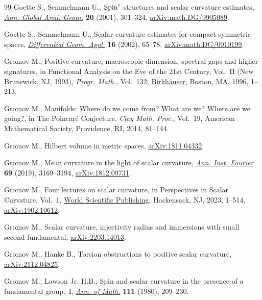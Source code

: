 \documentclass[pdftex]{sigma}
\numberwithin{equation}{section}
\begin{document}
\begin{thebibliography}{99}
Goette S., Semmelmann U., {${\rm Spin}^c$} structures and scalar curvature
  estimates, \href{https://doi.org/10.1023/A:1013035721335}{\textit{Ann. Global Anal. Geom.}} \textbf{20} (2001), 301--324,
  \href{https://arxiv.org/abs/math.DG/9905089}{arXiv:math.DG/9905089}.

Goette S., Semmelmann U., Scalar curvature estimates for compact symmetric
  spaces, \href{https://doi.org/10.1016/S0926-2245(01)00068-7}{\textit{Differential Geom. Appl.}} \textbf{16} (2002), 65--78,
  \href{https://arxiv.org/abs/math.DG/0010199}{arXiv:math.DG/0010199}.


Gromov M., Positive curvature, macroscopic dimension, spectral gaps and higher
  signatures, in Functional {A}nalysis on the {E}ve of the 21st {C}entury,
  {V}ol.~{II} ({N}ew {B}runswick, {NJ}, 1993), \textit{Progr. Math.}, Vol.~132,
  \href{https://doi.org/10.1007/978-1-4612-4098-3_1}{Birkh\"auser}, Boston, MA, 1996, 1--213.

Gromov M., Manifolds: {W}here do we come from? {W}hat are we? {W}here are we
  going?, in The {P}oincar\'e {C}onjecture, \textit{Clay Math. Proc.}, Vol.~19,
  American Mathematical Society, Providence, RI, 2014, 81--144.

Gromov M., Hilbert volume in metric spaces, \href{https://arxiv.org/abs/1811.04332}{arXiv:1811.04332}.

Gromov M., Mean curvature in the light of scalar curvature, \href{https://doi.org/10.5802/aif.3347}{\textit{Ann. Inst.
  Fourier}} \textbf{69} (2019), 3169--3194, \href{https://arxiv.org/abs/1812.09731}{arXiv:1812.09731}.

Gromov M., Four lectures on scalar curvature, in Perspectives in {S}calar
  {C}urvature. {V}ol.~1, \href{https://doi.org/10.1142/9789811273223_0001}{World Scientific Publishing}, Hackensack, NJ, 2023,
  1--514, \href{https://arxiv.org/abs/1902.10612}{arXiv:1902.10612}.

Gromov M., Scalar curvature, injectivity radius and immersions with small
  second fundamental, \href{https://arxiv.org/abs/2203.14013}{arXiv:2203.14013}.

Gromov M., Hanke B., Torsion obstructions to positive scalar curvature,
  \href{https://arxiv.org/abs/2112.04825}{arXiv:2112.04825}.

Gromov M., Lawson Jr. H.B., Spin and scalar curvature in the presence of a
  fundamental group.~{I}, \href{https://doi.org/10.2307/1971198}{\textit{Ann. of Math.}} \textbf{111} (1980), 209--230.


\end{thebibliography}
\end{document}
